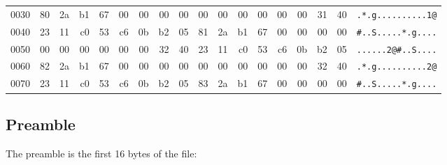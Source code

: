 \begin{table}[h*)]
\begin{tabular}{r|rrrrrrrrrrrrrrrr|l}
        \hline
        0030 &
            \cellcolor{yellow}80 & \cellcolor{yellow}2a & \cellcolor{yellow}b1 & \cellcolor{yellow}67 &
            \cellcolor{yellow}00 & \cellcolor{yellow}00 & \cellcolor{yellow}00 & \cellcolor{yellow}00 &
            \cellcolor{green!25}00 & \cellcolor{green!25}00 & \cellcolor{green!25}00 & \cellcolor{green!25}00 &
            \cellcolor{green!25}00 & \cellcolor{green!25}00 & \cellcolor{green!25}31 & \cellcolor{green!25}40 &
            \texttt{.*.g..........1@}\\
            \cline{10-17}
        0040 &
            \cellcolor{red!25}23 & \cellcolor{red!25}11 & \cellcolor{red!25}c0 & \cellcolor{red!25}53 &
            \cellcolor{red!25}c6 & \cellcolor{red!25}0b & \cellcolor{red!25}b2 & \multicolumn{1}{r|}{\cellcolor{red!25}05} &
            81 & 2a & b1 & 67 & 00 & 00 & 00 & 00 & \texttt{#..S.....*.g....}\\
        \cline{2-9}
        0050 & 00 & 00 & 00 & 00 & 00 & 00 & 32 & 40 & 23 & 11 & c0 & 53 & c6 & 0b & b2 & 05 & \texttt{......2@#..S....}\\
        \cline{2-17}
        0060 & 82 & 2a & b1 & 67 & 00 & 00 & 00 & 00 & 00 & 00 & 00 & 00 & 00 & 00 & 32 & 40 & \texttt{.*.g..........2@}\\
        \cline{10-17}
        0070 & 23 & 11 & c0 & 53 & c6 & 0b & b2 & \multicolumn{1}{r|}{05} & 83 & 2a & b1 & 67 & 00 & 00 & 00 & 00 & \texttt{#..S.....*.g....}\\
        \cline{2-9}
    \end{tabular}
\end{table}

\subsection{Preamble}
\label{subsec:database:preamble}

The preamble is the first 16 bytes of the file:

